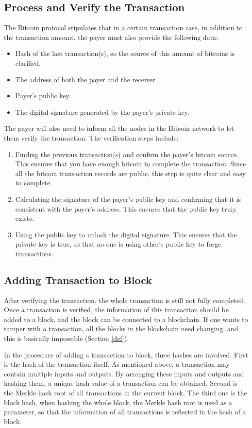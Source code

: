 \documentclass[12pt,a4paper]{article}
\begin{document}
\subsection{Process and Verify the Transaction} 
The Bitcoin protocol stipulates that in a certain transaction case, in addition to the transaction amount, the payer must also provide the following data:
\begin{itemize}
\item Hash of the last transaction(s), so the source of this amount of bitcoins is clarified.
\item The address of both the payer and the receiver.
\item Payer's public key.
\item The digital signature generated by the payer's private key.
\end{itemize}

The payer will also need to inform all the nodes in the Bitcoin network to let them verify the transaction. The verification steps include:
\begin{enumerate}
	\item Finding the previous transaction(s) and confirm the payer's bitcoin source. This ensures that you have enough bitcoin to complete the transaction. Since all the bitcoin transaction records are public, this step is quite clear and easy to complete.
 	\item Calculating the signature of the payer's public key and confirming that it is consistent with the payer's address. This ensures that the public key truly exists.
	\item Using the public key to unlock the digital signature. This ensures that the private key is true, so that no one is using other's public key to forge transactions.
\end{enumerate}

\subsection{Adding Transaction to Block} 
After verifying the transaction, the whole transaction is still not fully completed. 
Once a transaction is verified, the information of this transaction should be added to a block, and the block can be connected to a blockchain. If one wants to tamper with a transaction, all the blocks in the blockchain need changing, and this is basically impossible (Section \ref{def}). 

In the procedure of adding a transaction to block, three hashes are involved. First is the hash of the transaction itself. As mentioned above, a transaction may contain multiple inputs and outputs. By arranging these inputs and outputs and hashing them, a unique hash value of a transaction can be obtained. 
Second is the Merkle hash root of all transactions in the current block. 
The third one is the block hash, when hashing the whole block, the Merkle hash root is used as a parameter, so that the information of all transactions is reflected in the hash of a block.
\end{document}
